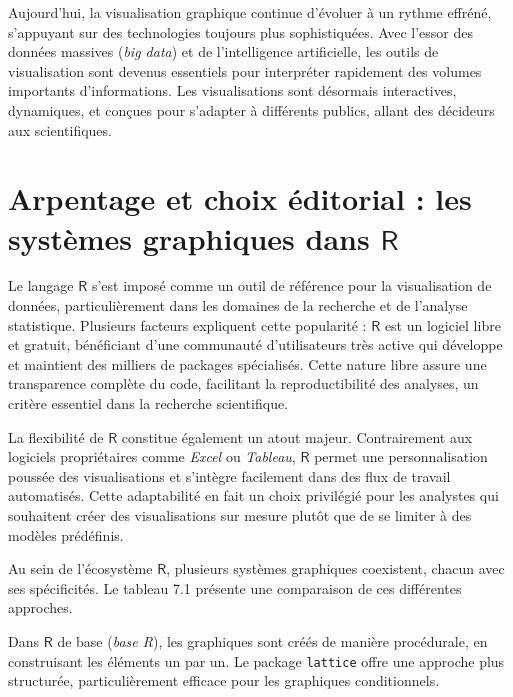 \documentclass[
  letterpaper,
  DIV=11,
  numbers=noendperiod,
  oneside]{scrreprt}
\begin{document}
Aujourd'hui, la visualisation graphique continue d'évoluer à un rythme
effréné, s'appuyant sur des technologies toujours plus sophistiquées.
Avec l'essor des données massives (\emph{big data}) et de l'intelligence
artificielle, les outils de visualisation sont devenus essentiels pour
interpréter rapidement des volumes importants d'informations. Les
visualisations sont désormais interactives, dynamiques, et conçues pour
s'adapter à différents publics, allant des décideurs aux scientifiques.

\hypertarget{arpentage-et-choix-uxe9ditorial-les-systuxe8mes-graphiques-dans-textsfr}{%
\section{\texorpdfstring{Arpentage et choix éditorial : les systèmes
graphiques dans
\(\textsf{R}\)}{Arpentage et choix éditorial : les systèmes graphiques dans \textbackslash textsf\{R\}}}\label{arpentage-et-choix-uxe9ditorial-les-systuxe8mes-graphiques-dans-textsfr}}

Le langage \(\textsf{R}\) s'est imposé comme un outil de référence pour
la visualisation de données, particulièrement dans les domaines de la
recherche et de l'analyse statistique. Plusieurs facteurs expliquent
cette popularité : \(\textsf{R}\) est un logiciel libre et gratuit,
bénéficiant d'une communauté d'utilisateurs très active qui développe et
maintient des milliers de packages spécialisés. Cette nature libre
assure une transparence complète du code, facilitant la reproductibilité
des analyses, un critère essentiel dans la recherche scientifique.

La flexibilité de \(\textsf{R}\) constitue également un atout majeur.
Contrairement aux logiciels propriétaires comme \emph{Excel} ou
\emph{Tableau}, \(\textsf{R}\) permet une personnalisation poussée des
visualisations et s'intègre facilement dans des flux de travail
automatisés. Cette adaptabilité en fait un choix privilégié pour les
analystes qui souhaitent créer des visualisations sur mesure plutôt que
de se limiter à des modèles prédéfinis.

Au sein de l'écosystème \(\textsf{R}\), plusieurs systèmes graphiques
coexistent, chacun avec ses spécificités. Le tableau 7.1 présente une
comparaison de ces différentes approches.

Dans \(\textsf{R}\) de base (\emph{base R}), les graphiques sont créés
de manière procédurale, en construisant les éléments un par un. Le
package \texttt{lattice} offre une approche plus structurée,
particulièrement efficace pour les graphiques conditionnels.
\end{document}
